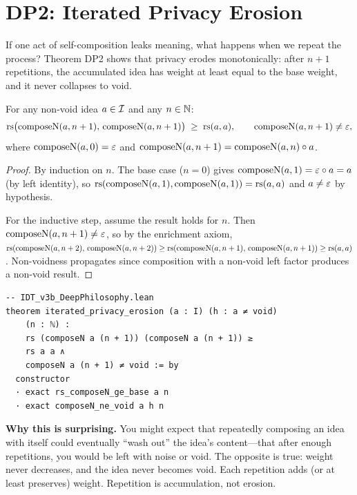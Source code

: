 \section{DP2: Iterated Privacy Erosion}

If one act of self-composition leaks meaning, what happens when we
repeat the process? Theorem DP2 shows that privacy erodes
monotonically: after $n + 1$ repetitions, the accumulated idea has
weight at least equal to the base weight, and it never collapses to
void.

\begin{theorem}
\label{thm:iterated-privacy}
For any non-void idea $a \in \mathcal{I}$ and any $n \in \mathbb{N}$:
\[
\mathrm{rs}\bigl(\mathrm{composeN}(a, n+1),\, \mathrm{composeN}(a, n+1)\bigr)
\;\geq\; \mathrm{rs}(a, a), \qquad
\mathrm{composeN}(a, n+1) \neq \varepsilon,
\]
where $\mathrm{composeN}(a, 0) = \varepsilon$ and
$\mathrm{composeN}(a, n+1) = \mathrm{composeN}(a, n) \circ a$.
\end{theorem}

\begin{proof}
By induction on $n$. The base case ($n = 0$) gives
$\mathrm{composeN}(a, 1) = \varepsilon \circ a = a$ (by left identity),
so $\mathrm{rs}(\mathrm{composeN}(a,1), \mathrm{composeN}(a,1)) = \mathrm{rs}(a,a)$
and $a \neq \varepsilon$ by hypothesis.

For the inductive step, assume the result holds for $n$. Then
$\mathrm{composeN}(a, n+1) \neq \varepsilon$, so by the enrichment axiom,
$\mathrm{rs}(\mathrm{composeN}(a, n+2),\, \mathrm{composeN}(a, n+2))
\geq \mathrm{rs}(\mathrm{composeN}(a, n+1),\, \mathrm{composeN}(a, n+1))
\geq \mathrm{rs}(a, a)$.
Non-voidness propagates since composition with a non-void left factor
produces a non-void result.
\end{proof}

\begin{lstlisting}
-- IDT_v3b_DeepPhilosophy.lean
theorem iterated_privacy_erosion (a : I) (h : a ≠ void)
    (n : ℕ) :
    rs (composeN a (n + 1)) (composeN a (n + 1)) ≥
    rs a a ∧
    composeN a (n + 1) ≠ void := by
  constructor
  · exact rs_composeN_ge_base a n
  · exact composeN_ne_void a h n
\end{lstlisting}

\begin{surprisebox}
\textbf{Why this is surprising.} You might expect that repeatedly
composing an idea with itself could eventually ``wash out'' the idea's
content---that after enough repetitions, you would be left with
noise or void. The opposite is true: weight never decreases, and the
idea never becomes void. Each repetition adds (or at least preserves)
weight. Repetition is accumulation, not erosion.
\end{surprisebox}

